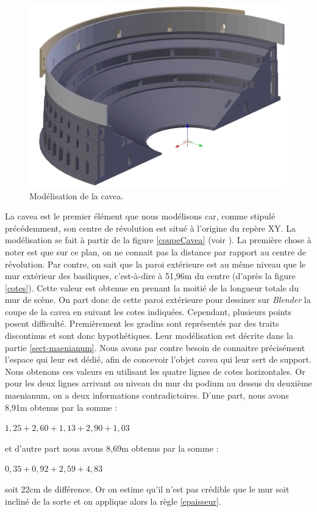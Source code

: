 \begin{figure}[!h]
\centering
	\includegraphics[width=\linewidth]{images/modCavea}
	\caption{Modélisation de la \gls{cavea}.} 
	\label{modCavea} 
\end{figure} 

La \gls{cavea} est le premier élément que nous modélisons car, comme stipulé précédemment, son centre de révolution est situé à l'origine du repère XY. La modélisation se fait à partir de la figure \ref{coupeCavea} (voir ). La première chose à noter est que sur ce plan, on ne connait pas la distance par rapport au centre de révolution. Par contre, on sait que la paroi extérieure est au même niveau que le mur extérieur des \glspl{basilique}, c'est-à-dire à 51,96m du centre (d'après la figure \ref{cotes}). Cette valeur est obtenue en prenant la moitié de la longueur totale du mur de scène. On part donc de cette paroi extérieure pour dessiner sur \textit{Blender} la coupe de la \gls{cavea} en suivant les cotes indiquées. Cependant, plusieurs points posent difficulté. Premièrement les gradins sont représentés par des traits discontinus et sont donc hypothétiques. Leur modélisation est décrite dans la partie \ref{sect-maenianum}. Nous avons par contre besoin de connaitre précisément l'espace qui leur est dédié, afin de concevoir l'objet  \gls{cavea} qui leur sert de support. Nous obtenons ces valeurs en utilisant les quatre lignes de cotes horizontales. Or pour les deux lignes arrivant au niveau du mur du  \gls{podium} au dessus du deuxième \gls{maenianum}, on a deux informations contradictoires. D'une part, nous avons 8,91m obtenus par la somme :
\begin{center}
$1,25+2,60+1,13+2,90+1,03$
\end{center}
et d'autre part nous avons 8,69m obtenus par la somme :
\begin{center}
$0,35+0,92+2,59+4,83$
\end{center}
soit 22cm de différence. Or on estime qu'il n'est pas crédible que le mur soit incliné de la sorte et on applique alors la règle \ref{epaisseur}. 

